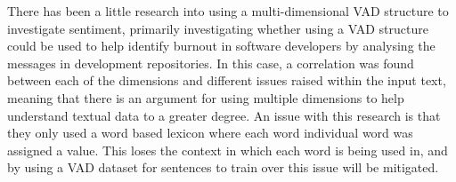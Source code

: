 There has been a little research into using a multi-dimensional VAD structure to investigate sentiment, primarily investigating whether using a VAD structure could be used to help identify burnout in software developers by analysing the messages in development repositories. \cite{mantyla2016mining} In this case, a correlation was found between each of the dimensions and different issues raised within the input text, meaning that there is an argument for using multiple dimensions to help understand textual data to a greater degree. An issue with this research is that they only used a word based lexicon where each word individual word was assigned a value. This loses the context in which each word is being used in, and by using a VAD dataset for sentences to train over this issue will be mitigated.


